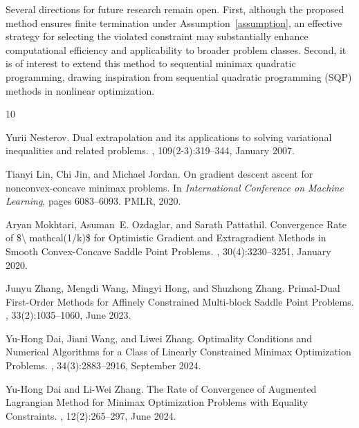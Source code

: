 \documentclass{article}
\begin{document}
	Several directions for future research remain open. 
	First, although the proposed method ensures finite termination under Assumption~\ref{assumption}, 
	an effective strategy for selecting the violated constraint may substantially enhance computational efficiency and applicability to broader problem classes. 
	Second, it is of interest to extend this method to sequential minimax quadratic programming, 
	drawing inspiration from sequential quadratic programming (SQP) methods in nonlinear optimization.
	
	
	\begin{thebibliography}{10}
		
		Yurii Nesterov.
		\newblock Dual extrapolation and its applications to solving variational
		inequalities and related problems.
		, 109(2-3):319--344, January 2007.
		
		Tianyi Lin, Chi Jin, and Michael Jordan.
		\newblock On gradient descent ascent for nonconvex-concave minimax problems.
		\newblock In {\em International Conference on Machine Learning}, pages
		6083--6093. PMLR, 2020.
		
		Aryan Mokhtari, Asuman~E. Ozdaglar, and Sarath Pattathil.
		\newblock Convergence {{Rate}} of \$\textbackslash
		mathcal\textbraceright (1/k)\$ for {{Optimistic Gradient}}
		and {{Extragradient Methods}} in {{Smooth Convex-Concave Saddle Point
				Problems}}.
		, 30(4):3230--3251, January 2020.
		
		Junyu Zhang, Mengdi Wang, Mingyi Hong, and Shuzhong Zhang.
		\newblock Primal-{{Dual First-Order Methods}} for {{Affinely Constrained
				Multi-block Saddle Point Problems}}.
		, 33(2):1035--1060, June 2023.
		
		Yu-Hong Dai, Jiani Wang, and Liwei Zhang.
		\newblock Optimality {{Conditions}} and {{Numerical Algorithms}} for a
		{{Class}} of {{Linearly Constrained Minimax Optimization Problems}}.
		, 34(3):2883--2916, September 2024.
		
		Yu-Hong Dai and Li-Wei Zhang.
		\newblock The {{Rate}} of {{Convergence}} of {{Augmented Lagrangian Method}}
		for {{Minimax Optimization Problems}} with {{Equality Constraints}}.
		,
		12(2):265--297, June 2024.
		

\end{thebibliography}
\end{document}

